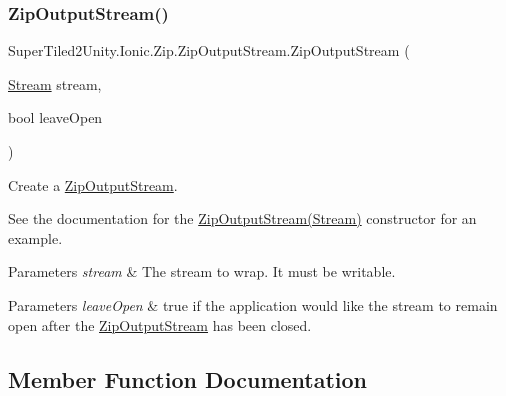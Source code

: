 \subsubsection{\texorpdfstring{Zip\+Output\+Stream()}{ZipOutputStream()}\hspace{0.1cm}{\footnotesize\ttfamily [3/3]}}
{\footnotesize\ttfamily Super\+Tiled2\+Unity.\+Ionic.\+Zip.\+Zip\+Output\+Stream.\+Zip\+Output\+Stream (\begin{DoxyParamCaption}\item[{\mbox{\hyperlink{namespace_super_tiled2_unity_1_1_ionic_1_1_zip_a9ced5352c56e7e0fceff15b534073c83aeae835e83c0494a376229f254f7d3392}{Stream}}}]{stream,  }\item[{bool}]{leave\+Open }\end{DoxyParamCaption})}



Create a \mbox{\hyperlink{class_super_tiled2_unity_1_1_ionic_1_1_zip_1_1_zip_output_stream}{Zip\+Output\+Stream}}. 

See the documentation for the \mbox{\hyperlink{class_super_tiled2_unity_1_1_ionic_1_1_zip_1_1_zip_output_stream_ae484108e008d5822cd7e140bcf44e9fe}{Zip\+Output\+Stream(\+Stream)}} constructor for an example. 


\begin{DoxyParams}{Parameters}
{\em stream} & The stream to wrap. It must be writable. \\
\hline
\end{DoxyParams}



\begin{DoxyParams}{Parameters}
{\em leave\+Open} & true if the application would like the stream to remain open after the {\ttfamily \mbox{\hyperlink{class_super_tiled2_unity_1_1_ionic_1_1_zip_1_1_zip_output_stream}{Zip\+Output\+Stream}}} has been closed. \\
\hline
\end{DoxyParams}


\subsection{Member Function Documentation}
\mbox{\label{class_super_tiled2_unity_1_1_ionic_1_1_zip_1_1_zip_output_stream_a0940da1079aec5a86af767da50b1ba0d}} 

